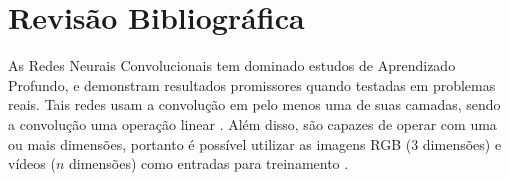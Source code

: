 \chapter{Revis{\~{a}}o Bibliogr{\'{a}}fica}
\label{chap:am}






As Redes Neurais Convolucionais tem dominado estudos de Aprendizado Profundo, e demonstram resultados promissores quando testadas em problemas reais. Tais redes usam a convolução em pelo menos uma de suas camadas, sendo a convolução uma operação linear \cite{deeplearningbook}. Além disso, são capazes de operar com uma ou mais dimensões, portanto é possível utilizar as imagens RGB ($3$ dimensões) e vídeos ($n$ dimensões) como entradas para treinamento \cite{5605630}.





